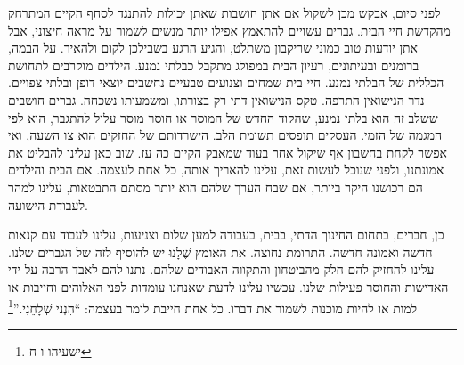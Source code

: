 \documentclass[12pt, extrafontsizes, twopage, a5paper]{memoir}
\begin{document}
לפני סיום, אבקש מכן לשקול אם
אתן חושבות שאתן יכולות להתנגד לסחף הקיים המתרחק
מהקדשת חיי הבית. גברים עשויים להתאמץ אפילו יותר
מנשים לשמור על מראה חיצוני, אבל אתן יודעות טוב כמוני
שריקבון משתלט, והגיע הרגע
בשבילכן לקום ולהאיר. על הבמה,
ברומנים ובעיתונים, רעיון הבית במפולג
מתקבל כבלתי נמנע. הילדים מוקרבים
לתחושת הכללית של הבלתי נמנע.
חיי בית שמחים וצנועים טבעיים נחשבים
יוצאי דופן ובלתי צפויים. נדר הנישואין התרפה.
טקס הנישואין דתי רק בצורתו,
ומשמעותו נשכחה. גברים חושבים
ששלב זה הוא בלתי נמנע, שהקוד החדש של המוסר או
חוסר מוסר עלול להתגבר, הוא לפי המגמה של הזמי.
העסקים תופסים תשומת הלב. הישרדותם של החזקים
הוא צו השעה, ואי אפשר לקחת בחשבון אף שיקול אחר
בעוד שמאבק הקיום כה עז. שוב כאן
עלינו להבליט את אמונתנו, ולפני שנוכל לעשות זאת, עלינו להאריך אותה,
כל אחת לעצמה. אם הבית והילדים
הם רכושנו היקר ביותר, אם שבח
הערך שלהם הוא יותר מסתם התבטאות, עלינו
למהר לעבודת הישועה.

כן, חברים, בתחום החינוך הדתי, בבית,
בעבודה למען שלום וצניעות, עלינו לעבוד עם
קנאות חדשה ואמונה חדשה. התרומת נחוצה. את האומץ שֶׁלָנוּ
יש להוסיף לזה של הגברים שלנו. עלינו להחזיק
להם חלק מהביטחון והתקווה האבודים שלהם. נתנו
להם לאבד הרבה על ידי האדישות והחוסר פעילות שלנו. עכשיו עלינו
לדעת שאנחנו עומדות לפני האלוהים וחייבות או למות
או להיות מוכנות לשמור את דברו. כל אחת חייבת לומר
בעצמה: ``הִנְנִי שְׁלָחֵנִי.''\footnote{ישעיהו ו ח}
\end{document}
